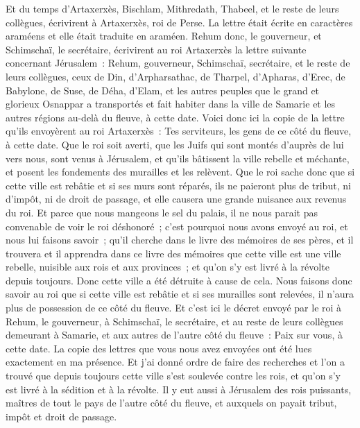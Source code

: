 \begin{multicols}{2}
Et du temps d'Artaxerxès, Bischlam, Mithredath, Thabeel, et le reste de leurs collègues, écrivirent à Artaxerxès, roi de Perse. La lettre était écrite en caractères araméens et elle était traduite en araméen.
Rehum donc, le gouverneur, et Schimschaï, le secrétaire, écrivirent au roi Artaxerxès la lettre suivante concernant Jérusalem~:
Rehum, gouverneur, Schimschaï, secrétaire, et le reste de leurs collègues, ceux de Din, d'Arpharsathac, de Tharpel, d'Apharas, d'Erec, de Babylone, de Suse, de Déha, d'Elam,
et les autres peuples que le grand et glorieux Osnappar a transportés et fait habiter dans la ville de Samarie et les autres régions au-delà du fleuve, à cette date.
Voici donc ici la copie de la lettre qu'ils envoyèrent au roi Artaxerxès~: Tes serviteurs, les gens de ce côté du fleuve, à cette date.
Que le roi soit averti, que les Juifs qui sont montés d'auprès de lui vers nous, sont venus à Jérusalem, et qu'ils bâtissent la ville rebelle et méchante, et posent les fondements des murailles et les relèvent.
Que le roi sache donc que si cette ville est rebâtie et si ses murs sont réparés, ils ne paieront plus de tribut, ni d'impôt, ni de droit de passage, et elle causera une grande nuisance aux revenus du roi.
Et parce que nous mangeons le sel du palais, il ne nous parait pas convenable de voir le roi déshonoré~; c'est pourquoi nous avons envoyé au roi, et nous lui faisons savoir~;
qu'il cherche dans le livre des mémoires de ses pères, et il trouvera et il apprendra dans ce livre des mémoires que cette ville est une ville rebelle, nuisible aux rois et aux provinces~; et qu'on s'y est livré à la révolte depuis toujours. Donc cette ville a été détruite à cause de cela.
Nous faisons donc savoir au roi que si cette ville est rebâtie et si ses murailles sont relevées, il n'aura plus de possession de ce côté du fleuve.
Et c'est ici le décret envoyé par le roi à Rehum, le gouverneur, à Schimschaï, le secrétaire, et au reste de leurs collègues demeurant à Samarie, et aux autres de l'autre côté du fleuve~: Paix sur vous, à cette date.
La copie des lettres que vous nous avez envoyées ont été lues exactement en ma présence.
Et j'ai donné ordre de faire des recherches et l'on a trouvé que depuis toujours cette ville s'est soulevée contre les rois, et qu'on s'y est livré à la sédition et à la révolte.
Il y eut aussi à Jérusalem des rois puissants, maîtres de tout le pays de l'autre côté du fleuve, et auxquels on payait tribut, impôt et droit de passage.

\end{multicols}
